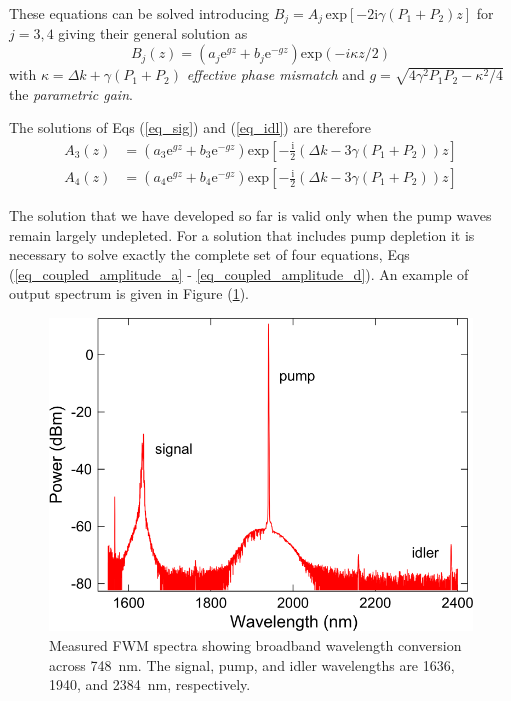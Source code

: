 \documentclass[12pt,a4paper,twoside]{article}
\begin{document}
These equations can be solved introducing $B_j = A_j \,\mathrm{exp}[-2\mathrm{i}\gamma(P_1+P_2)z]$ for $j=3,4$ giving their general solution as
\begin{equation*}
	B_j(z) = (a_j\mathrm{e}^{gz}+b_j\mathrm{e}^{-gz})\mathrm{exp}(-i\kappa z/2)
\end{equation*}
with $\kappa = \Delta k + \gamma(P_1 + P_2)$ \textit{effective phase mismatch} and $g = \sqrt{4\gamma^2P_1P_2 - \kappa^2/4}$ the \textit{parametric gain}.

The solutions of Eqs (\ref{eq_sig}) and (\ref{eq_idl}) are therefore
\begin{subequations}
\begin{align}
	A_3(z) &= \left(a_3\mathrm{e}^{gz}+b_3\mathrm{e}^{-gz}\right)\mathrm{exp}\left[-\frac{\mathrm{i}}{2}(\Delta k -3\gamma(P_1 + P_2))z\right]
		\label{eq_sig_sol} \\
	A_4(z) &= \left(a_4\mathrm{e}^{gz}+b_4\mathrm{e}^{-gz}\right)\mathrm{exp}\left[-\frac{\mathrm{i}}{2}(\Delta k -3\gamma(P_1 + P_2))z\right]	
		\label{eq_idl_sol}
\end{align}
\end{subequations}

The solution that we have developed so far is valid only when the pump waves remain largely undepleted.
For a solution that includes pump depletion it is necessary to solve exactly the complete set of four equations, Eqs (\ref{eq_coupled_amplitude_a} - \ref{eq_coupled_amplitude_d}).
An example of output spectrum is given in Figure (\ref{fig_spectrum}).
\begin{figure}[!h]
	\centering
	\includegraphics[width=.55\textwidth]{spectrum.png}
	\caption{Measured FWM spectra showing broadband wavelength conversion across \SI{748}{\nm}. The signal, pump, and idler wavelengths are \num{1636}, \num{1940}, and \SI{2384}{\nm}, respectively. \cite{spectrum}}
	\label{fig_spectrum}
\end{figure}
\end{document}
